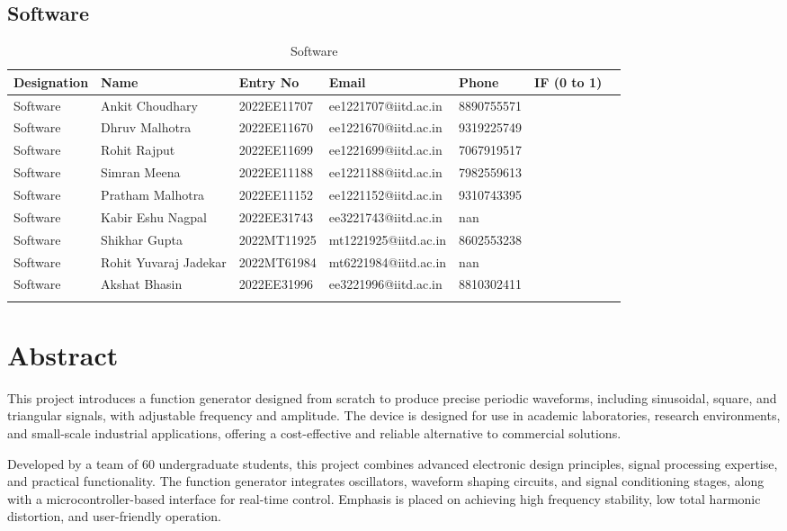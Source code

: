 \documentclass[a4paper,12pt]{article}
\begin{document}
\subsection{Software}
\begin{longtable}[c]{|l|l|l|l|l|l|l|}
\hline
\textbf{Designation} & \textbf{Name} & \textbf{Entry No} & \textbf{Email} & \textbf{Phone} & \textbf{IF (0 to 1)} \\
\hline
Software & Ankit Choudhary & 2022EE11707 & ee1221707@iitd.ac.in & 8890755571 &  &  \\ \hline
Software & Dhruv Malhotra & 2022EE11670 & ee1221670@iitd.ac.in & 9319225749 &  &  \\ \hline
Software & Rohit Rajput & 2022EE11699 & ee1221699@iitd.ac.in & 7067919517 &  &  \\ \hline
Software & Simran Meena & 2022EE11188 & ee1221188@iitd.ac.in & 7982559613 &  &  \\ \hline
Software & Pratham Malhotra & 2022EE11152 & ee1221152@iitd.ac.in & 9310743395 &  &  \\ \hline
Software & Kabir Eshu Nagpal & 2022EE31743 & ee3221743@iitd.ac.in & nan &  &  \\ \hline
Software & Shikhar Gupta & 2022MT11925 & mt1221925@iitd.ac.in & 8602553238 &  &  \\ \hline
Software & Rohit Yuvaraj Jadekar & 2022MT61984 & mt6221984@iitd.ac.in & nan &  &  \\ \hline
Software & Akshat Bhasin & 2022EE31996 & ee3221996@iitd.ac.in & 8810302411 &  &  \\ \hline
\caption{Software}
\end{longtable}


\newpage
\section{Abstract}
This project introduces a function generator designed from scratch to produce precise periodic waveforms, including sinusoidal, square, and triangular signals, with adjustable frequency and amplitude. The device is designed for use in academic laboratories, research environments, and small-scale industrial applications, offering a cost-effective and reliable alternative to commercial solutions.

Developed by a team of 60 undergraduate students, this project combines advanced electronic design principles, signal processing expertise, and practical functionality. The function generator integrates oscillators, waveform shaping circuits, and signal conditioning stages, along with a microcontroller-based interface for real-time control. Emphasis is placed on achieving high frequency stability, low total harmonic distortion, and user-friendly operation.
\end{document}
